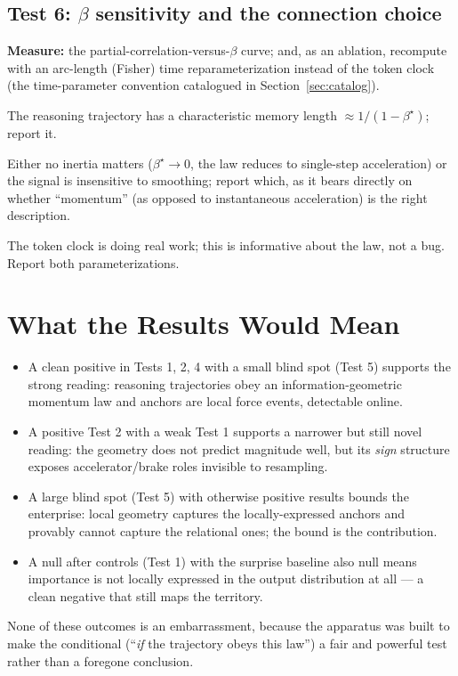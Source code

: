 \documentclass[11pt]{article}
\begin{document}
\subsection{Test 6: $\beta$ sensitivity and the connection choice}
\textbf{Measure:} the partial-correlation-versus-$\beta$ curve; and, as an ablation, recompute with an arc-length (Fisher) time reparameterization instead of the token clock (the time-parameter convention catalogued in Section~\ref{sec:catalog}).
\begin{description}[leftmargin=1.5em]
  \item[Smooth curve with an interior optimum.] The reasoning trajectory has a characteristic memory length $\approx 1/(1-\beta^\star)$; report it.
  \item[Monotone or flat in $\beta$.] Either no inertia matters ($\beta^\star\to 0$, the law reduces to single-step acceleration) or the signal is insensitive to smoothing; report which, as it bears directly on whether ``momentum'' (as opposed to instantaneous acceleration) is the right description.
  \item[Clock-sensitive (arc-length differs materially from token-time).] The token clock is doing real work; this is informative about the law, not a bug. Report both parameterizations.
\end{description}

\section{What the Results Would Mean}

\begin{itemize}[leftmargin=1.5em]
  \item A clean positive in Tests 1, 2, 4 with a small blind spot (Test 5) supports the strong reading: reasoning trajectories obey an information-geometric momentum law and anchors are local force events, detectable online.
  \item A positive Test 2 with a weak Test 1 supports a narrower but still novel reading: the geometry does not predict magnitude well, but its \emph{sign} structure exposes accelerator/brake roles invisible to resampling.
  \item A large blind spot (Test 5) with otherwise positive results bounds the enterprise: local geometry captures the locally-expressed anchors and provably cannot capture the relational ones; the bound is the contribution.
  \item A null after controls (Test 1) with the surprise baseline also null means importance is not locally expressed in the output distribution at all --- a clean negative that still maps the territory.
\end{itemize}
None of these outcomes is an embarrassment, because the apparatus was built to make the conditional (``\emph{if} the trajectory obeys this law'') a fair and powerful test rather than a foregone conclusion.
\end{document}
